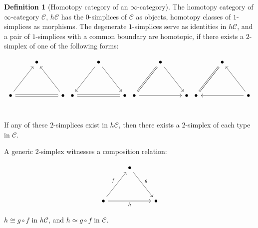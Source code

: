 \documentclass[10pt]{amsart}
\newcommand{\8}{\ensuremath{\infty}}
\newcommand{\0}{\ensuremath{\overset{\rightarrow}{0}}}
\newcommand{\1}{\ensuremath{\mathbf{1}}}
\newcommand{\C}{\ensuremath{\mathscr{C}}}
\theoremstyle{definition}
\newtheorem{definition}{Definition}[section]
\numberwithin{definition}{subsection}
\numberwithin{definition}{section}
\begin{document}
\begin{definition}[Homotopy category of an \8-category]
  The homotopy category of \8-category $\C$, $h\C$ has the $0$-simplices of $\C$ as objects, homotopy classes of $1$-simplices as morphisms. The degenerate $1$-simplices serve as identities in $h\C$, and a pair of $1$-simplices with a common boundary are homotopic, if there exists a $2$-simplex of one of the following forms:

  \begin{equation*}
    \begin{tikzcd}
      & \bullet & \\
      \\
      \bullet \arrow[uur] \arrow[rr, equals] & & \bullet \arrow[uul] \\
    \end{tikzcd}
    \begin{tikzcd}
      & \bullet \arrow[ddl] \arrow[ddr] & \\
      \\
      \bullet \arrow[rr, equals] & & \bullet \\
    \end{tikzcd}
    \begin{tikzcd}
      & \bullet \arrow[ddr] & \\
      \\
      \bullet \arrow[uur, equals] \arrow[rr] & & \bullet \\
    \end{tikzcd}
    \begin{tikzcd}
      & \bullet & \\
      \\
      \bullet \arrow[uur, equals] & & \bullet \arrow[uul] \arrow[ll] \\
    \end{tikzcd}
  \end{equation*}

  If any of these $2$-simplices exist in $h\C$, then there exists a $2$-simplex of each type in $\C$.

  A generic $2$-simplex witnesses a composition relation:

  \begin{equation*}
    \begin{tikzcd}
      & \bullet \arrow[ddr, "g"] & \\
      \\
      \bullet \arrow[uur, "f"] \arrow[rr, "h"'] & & \bullet
    \end{tikzcd}
  \end{equation*}

  $h \cong g \circ f$ in $h\C$, and $h \simeq g \circ f$ in $\C$.
\end{definition}
\end{document}

